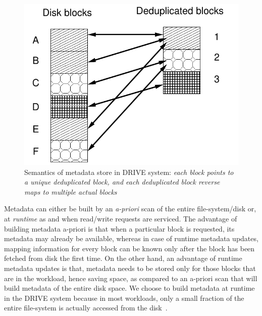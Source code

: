 \begin{figure}
    \centering
    \includegraphics[scale=0.6]{confided-figures/main/deduped-block.pdf}
    \caption{Semantics of metadata store in DRIVE system: \textit{each block points to a unique deduplicated block, and each deduplicated block reverse maps to multiple actual blocks}}
    \label{fig:deduped-block}
\end{figure}

Metadata can either be built by an \textit{a-priori} scan of the entire
file-system/disk or, at \textit{runtime} as and when read/write
requests are serviced. The advantage of building metadata a-priori is that
when a particular block is requested, its metadata may already be
available,
whereas in case of runtime metadata updates, mapping information for
every block can be known only after the block has been fetched from disk
the first time.
On the other hand, an advantage of runtime metadata updates is that,
metadata needs to be stored only for those blocks that are in the workload,
hence saving space, as compared to an a-priori scan that will build metadata
of the entire disk space. We choose to build metadata at runtime in the
DRIVE system because in most workloads, only a small fraction of the 
entire file-system is actually accessed from the disk~\cite{iodedup}.

